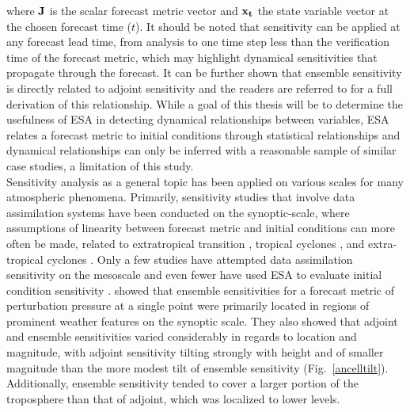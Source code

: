 \documentclass{ttuthes2007}
\newcommand{\tab}{\hspace*{2em}}  %
\begin{document}
where $\bf{J}$ is the scalar forecast metric vector and $\bf{x_t}$ the state variable vector at the chosen forecast time ($t$). It should be noted that sensitivity can be applied at any forecast lead time, from analysis to one time step less than the verification time of the forecast metric, which may highlight dynamical sensitivities that propagate through the forecast. It can be further shown that ensemble sensitivity is directly related to adjoint sensitivity and the readers are referred to \cite{AncellandHakim2007a} for a full derivation of this relationship. While a goal of this thesis will be to determine the usefulness of ESA in detecting dynamical relationships between variables, ESA relates a forecast metric to initial conditions through statistical relationships and dynamical relationships can only be inferred with a reasonable sample of similar case studies, a limitation of this study. \\

\tab Sensitivity analysis as a general topic has been applied on various scales for many atmospheric phenomena. Primarily, sensitivity studies that involve data assimilation systems have been conducted on the synoptic-scale, where assumptions of linearity between forecast metric and initial conditions can more often be made, related to extratropical transition \citep[e.g.,][]{TornandHakim2009, Anwenderetal2012}, tropical cyclones \citep[e.g.,][]{Torn2010, QinandMu2011, ItoandWu2013, TornandCook2013, Xieetal2013, Torn2014}, and extra-tropical cyclones \citep[e.g.,][]{AncellandHakim2007a, TornandHakim2008a, GarciesandHomar2009, GarciesandHomar2010, Changetal2013, McMurdieandAncell2013}. Only a few studies have attempted data assimilation sensitivity on the mesoscale \citep[e.g.,][]{MartinandXue2006,MelhauserandZhang2012} and even fewer have used ESA to evaluate initial condition sensitivity \citep[e.g.,][]{Zacketal2010a,Zacketal2010b,Zacketal2010c,Zacketal2011a,Zacketal2011b,BednarczykandAncell2014}. \cite{AncellandHakim2007a} showed that ensemble sensitivities for a forecast metric of perturbation pressure at a single point were primarily located in regions of prominent weather features on the synoptic scale. They also showed that adjoint and ensemble sensitivities varied considerably in regards to location and magnitude, with adjoint sensitivity tilting strongly with height and of smaller magnitude than the more modest tilt of ensemble sensitivity (Fig.~\ref{ancelltilt}). Additionally, ensemble sensitivity tended to cover a larger portion of the troposphere than that of adjoint, which was localized to lower levels. \\
\end{document}
